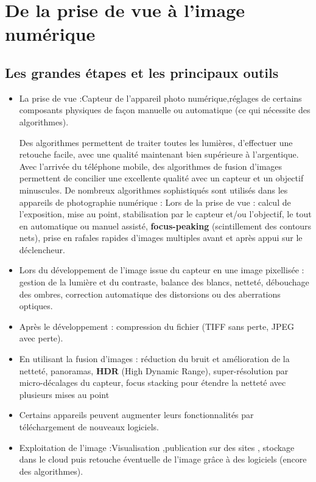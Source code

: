 \documentclass[10pt,fleqn]{article} %
\begin{document}
\section{De la prise de vue à l'image numérique}

\subsection{Les grandes étapes et les principaux outils}

\begin{itemize}
	\item La prise de vue :Capteur de l'appareil photo numérique,réglages de certains composants physiques de façon manuelle ou automatique  (ce qui nécessite des algorithmes).
	
	Des algorithmes permettent de traiter toutes les lumières, d’effectuer une retouche facile,
	avec une qualité maintenant bien supérieure à l’argentique. Avec l’arrivée du téléphone
	mobile, des algorithmes de fusion d’images permettent de concilier une excellente qualité
	avec un capteur et un objectif minuscules.
	De nombreux algorithmes sophistiqués sont utilisés dans les appareils de photographie
	numérique :
    Lors de la prise de vue : calcul de l’exposition, mise au point, stabilisation par le
	capteur et/ou l’objectif, le tout en automatique ou manuel assisté, \textbf{focus-peaking}
	(scintillement des contours nets), prise en rafales rapides d’images multiples avant et
	après appui sur le déclencheur.
    \item Lors du développement de l’image issue du capteur en une image pixellisée : gestion
	de la lumière et du contraste, balance des blancs, netteté, débouchage des ombres,
	correction automatique des distorsions ou des aberrations optiques.
    \item  Après le développement : compression du fichier (TIFF sans perte, JPEG avec
	perte).
    \item En utilisant la fusion d’images : réduction du bruit et amélioration de la netteté,
	panoramas,\textbf{ HDR} (High Dynamic Range), super-résolution par micro-décalages du
	capteur, focus stacking pour étendre la netteté avec plusieurs mises au point
    \item Certains appareils peuvent augmenter leurs fonctionnalités par téléchargement de
	nouveaux logiciels.
	\item Exploitation de l'image :Visualisation ,publication sur des sites , stockage dans le cloud puis retouche éventuelle de l'image grâce à des logiciels (encore des algorithmes).
\end{itemize}
\end{document}
